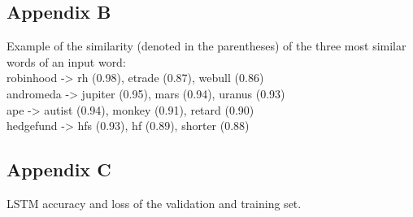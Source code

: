 \documentclass[11pt, a4paper]{article}
\begin{document}
\subsection{Appendix B}
\label{appendix:B}

Example of the similarity (denoted in the parentheses) of the three most similar words of an input word: \\
robinhood -> rh (0.98), etrade (0.87), webull (0.86) \\
andromeda -> jupiter (0.95), mars (0.94), uranus (0.93) \\
ape -> autist (0.94), monkey (0.91), retard (0.90) \\
hedgefund -> hfs (0.93), hf (0.89), shorter (0.88) \\

\newpage
\subsection{Appendix C}
LSTM accuracy and loss of the validation and training set.
\label{appendix:LSTM_Sentiment_Classifier}
\end{document}
